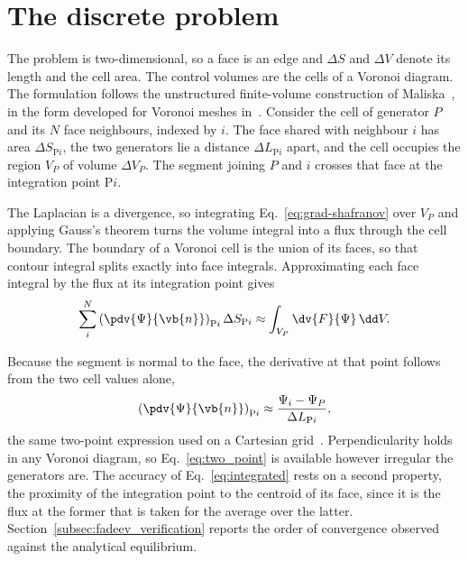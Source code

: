 \section{The discrete problem}
\label{sec:discrete_problem}

The problem is two-dimensional, so a face is an edge and $\Delta S$ and $\Delta V$ denote its length and the cell area. The control volumes are the cells of a Voronoi diagram. The formulation follows the unstructured finite-volume construction of Maliska~\cite{Maliska2023FundamentalsDynamics}, in the form developed for Voronoi meshes in~\cite{Vasconcellos2004}. Consider the cell of generator $P$ and its $N$ face neighbours, indexed by $i$. The face shared with neighbour $i$ has area $\Delta S_{\mathrm{P}i}$, the two generators lie a distance $\Delta L_{\mathrm{P}i}$ apart, and the cell occupies the region $V_P$ of volume $\Delta V_P$. The segment joining $P$ and $i$ crosses that face at the integration point $\mathrm{P}i$.

The Laplacian is a divergence, so integrating Eq.~\eqref{eq:grad-shafranov} over $V_P$ and applying Gauss's theorem turns the volume integral into a flux through the cell boundary. The boundary of a Voronoi cell is the union of its faces, so that contour integral splits exactly into face integrals. Approximating each face integral by the flux at its integration point gives
\begin{equation}
  \sum_{i}^{N} \left( \pdv{\Psi}{\vb{n}} \right)_{\mathrm{P}i} \Delta S_{\mathrm{P}i} \approx \int_{V_P} \dv{F}{\Psi} \, \dd V .
  \label{eq:integrated}
\end{equation}

Because the segment is normal to the face, the derivative at that point follows from the two cell values alone,
\begin{equation}
  \left( \pdv{\Psi}{\vb{n}} \right)_{\mathrm{P}i} \approx \frac{\Psi_i - \Psi_P}{\Delta L_{\mathrm{P}i}} ,
  \label{eq:two_point}
\end{equation}
the same two-point expression used on a Cartesian grid~\cite{Vasconcellos2004}. Perpendicularity holds in any Voronoi diagram, so Eq.~\eqref{eq:two_point} is available however irregular the generators are. The accuracy of Eq.~\eqref{eq:integrated} rests on a second property, the proximity of the integration point to the centroid of its face, since it is the flux at the former that is taken for the average over the latter. Section~\ref{subsec:fadeev_verification} reports the order of convergence observed against the analytical equilibrium.

